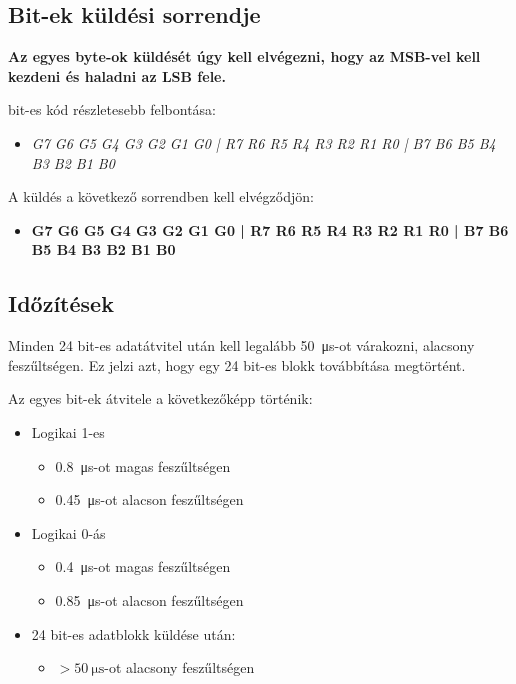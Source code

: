 \documentclass[10pt]{article} %
\begin{document}
\subsection{Bit-ek küldési sorrendje}

\textbf{Az egyes byte-ok küldését úgy kell elvégezni, hogy az MSB-vel kell kezdeni és haladni az LSB fele.}

 bit-es kód részletesebb felbontása: 
\begin{itemize}
\item \textit{G7 G6 G5 G4 G3 G2 G1 G0 | R7 R6 R5 R4 R3 R2 R1 R0 | B7 B6 B5 B4 B3 B2 B1 B0}
\end{itemize}

\noindent A küldés a következő sorrendben kell elvégződjön: 
\begin{itemize}
\item \textbf{G7 G6 G5 G4 G3 G2 G1 G0 | R7 R6 R5 R4 R3 R2 R1 R0 | B7 B6 B5 B4 B3 B2 B1 B0}
\end{itemize}

\subsection{Időzítések}

Minden 24 bit-es adatátvitel után kell legalább \SI{50}{\micro\second}-ot várakozni, alacsony feszűltségen. Ez jelzi azt, hogy egy 24 bit-es blokk továbbítása megtörtént.

\noindent Az egyes bit-ek átvitele a következőképp történik:

\begin{itemize}
\item Logikai 1-es
	\begin{itemize}
	\item \SI{0.8}{\micro\second}-ot magas feszűltségen
	\item \SI{0.45}{\micro\second}-ot alacson feszűltségen
	\end{itemize}
\item Logikai 0-ás
	\begin{itemize}
	\item \SI{0.4}{\micro\second}-ot magas feszűltségen
	\item \SI{0.85}{\micro\second}-ot alacson feszűltségen
	\end{itemize}
\item 24 bit-es adatblokk küldése után: 
	\begin{itemize}
		\item $ > \SI{50}{\micro\second}$-ot alacsony feszűltségen
	\end{itemize}
\end{itemize}
\end{document}
